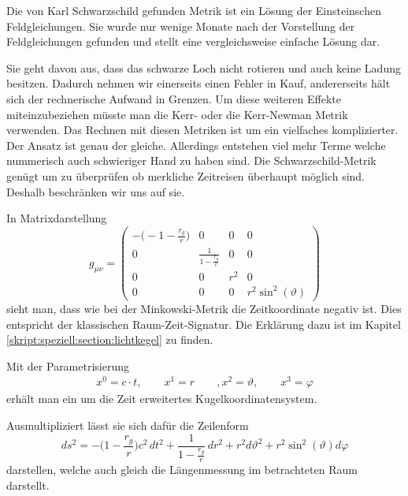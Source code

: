 \begin{refsection}
	Die von Karl Schwarzschild gefunden Metrik ist ein Lösung der Einsteinschen Feldgleichungen. Sie wurde nur wenige Monate nach der Vorstellung der Feldgleichungen gefunden und stellt eine vergleichsweise einfache Lösung dar. 
    
    Sie geht davon aus, dass das schwarze Loch nicht rotieren und auch keine Ladung besitzen. Dadurch nehmen wir einerseits einen Fehler in Kauf, andererseits hält sich der rechnerische Aufwand in Grenzen. Um diese weiteren Effekte miteinzubeziehen müsste man die Kerr- oder die Kerr-Newman Metrik verwenden. Das Rechnen mit diesen Metriken ist um ein vielfaches komplizierter. Der Ansatz ist genau der gleiche. Allerdings entstehen viel mehr Terme welche nummerisch auch schwieriger Hand zu haben sind. Die Schwarzschild-Metrik genügt um zu überprüfen ob merkliche Zeitreisen überhaupt möglich sind. Deshalb beschränken wir uns auf sie.
    
	In Matrixdarstellung
	\begin{equation}\label{equation:schwarzschild}
	g_{\mu\nu}=
	\begin{pmatrix}
	-\biggl(-1- \displaystyle \frac{r_{g}}{r}\biggr) & 0 & 0 & 0 \\
	0 & \frac{\displaystyle 1}{\displaystyle1-\frac{r_{g}}{r}} & 0 & 0 \\
	0 & 0 & r^{2} & 0 \\
	0 & 0 & 0 & r^{2}\sin^{2}(\vartheta)
	\end{pmatrix}
	\end{equation}
	sieht man, dass wie bei der Minkowski-Metrik die Zeitkoordinate negativ ist. Dies entspricht der klassischen Raum-Zeit-Signatur. Die Erklärung dazu ist im Kapitel \ref{skript:speziell:section:lichtkegel} zu finden.
    
	Mit der Parametrisierung
	\begin{align*}
	x^{0}=c \cdot t, \qquad
	x^{1}=r \qquad,
	x^{2}=\vartheta, \qquad
	x^{3}=\varphi
	\end{align*}
    erhält man ein um die Zeit erweitertes Kugelkoordinatensystem.
    
	Ausmultipliziert lässt sie sich dafür die Zeilenform
	\begin{equation}
	ds^2
	=
	-\biggl(1-\frac{r_g}r\biggr)c^2\,dt^2
	+
	\frac{1}{\displaystyle 1-\frac{r_g}r}\,dr^2 
	+
	r^2d\vartheta^2 
	+ 
	r^2\sin^2(\vartheta)d\varphi
	\end{equation}
	darstellen, welche auch gleich die Längenmessung im betrachteten Raum darstellt.
	

\end{refsection}
